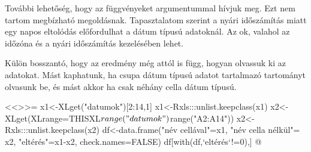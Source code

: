 \begin{description}
  További lehetőség, hogy az
   függvényeket  argumentummal
  hívjuk meg. Ezt 
  nem tartom megbízható megoldásnak. Tapasztalatom szerint a nyári
  időszámítás miatt egy napos eltolódás előfordulhat a dátum típusú 
  adatoknál. Az ok, valahol az időzóna és a nyári időszámítás
  kezelésében lehet.  
  Külön bosszantó, hogy az eredmény még attól is függ, hogyan olvassuk
  ki az adatokat.  Mást kaphatunk, ha csupa dátum típusú adatot
  tartalmazó tartományt olvasunk be, és mást akkor ha csak néhány
  cella dátum típusú.  
  \begin{Rnw}
<<>>=
x1<-XLget("datumok")[2:14,1]
x1<-Rxls:::unlist.keepclass(x1)
x2<-XLget(XLrange=THISXL$range("datumok")$range("A2:A14"))
x2<-Rxls:::unlist.keepclass(x2)
df<-data.frame("név cellával"=x1,
               "név cella nélkül"= x2, "eltérés"=x1-x2,
               check.names=FALSE)
df[with(df,`eltérés`!=0),]
@ 
  \end{Rnw}

\end{description}
